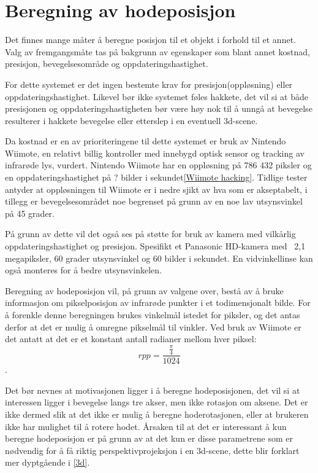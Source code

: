 \documentclass{report}
\begin{document}
\section{Beregning av hodeposisjon}
Det finnes mange måter å beregne posisjon til et objekt i forhold til et annet.
Valg av fremgangsmåte tas på bakgrunn av egenskaper som blant annet kostnad, presisjon, bevegelsesområde og oppdateringshastighet.

For dette systemet er det ingen bestemte krav for presisjon(oppløsning) eller oppdateringshastighet. Likevel bør ikke systemet
føles hakkete, det vil si at både presisjonen og oppdateringshastigheten bør være høy nok til å unngå at bevegelse resulterer i
hakkete bevegelse eller etterslep i en eventuell 3d-scene.

Da kostnad er en av prioriteringene til dette systemet er bruk av Nintendo Wiimote, en relativt billig kontroller med
innebygd optisk sensor og tracking av infrarøde lys, vurdert. Nintendo Wiimote har en oppløsning på 786 432 piksler og en oppdateringshastighet 
på ? bilder i sekundet\ref{Wiimote hacking}. Tidlige tester antyder at oppløsningen til Wiimote er i nedre sjikt av hva som er
akseptabelt, i tillegg er bevegelsesområdet noe begrenset på grunn av en noe lav utsynsvinkel på 45 grader.

På grunn av dette vil det også ses på støtte for bruk av kamera med vilkårlig oppdateringshastighet og presisjon.
Spesifikt et Panasonic HD-kamera med ~2,1 megapiksler, 60 grader utsynsvinkel og 60 bilder i sekundet. En vidvinkellinse
kan også monteres for å bedre utsynsvinkelen.

Beregning av hodeposisjon vil, på grunn av valgene over, bestå av å bruke informasjon om pikselposisjon av infrarøde punkter
i et todimensjonalt bilde. For å forenkle denne beregningen brukes vinkelmål istedet for piksler, og det antas derfor
at det er mulig å omregne pikselmål til vinkler. Ved bruk av Wiimote er det antatt at det er et konstant antall radianer
mellom hver piksel: $$rpp = \frac{\frac{\pi}{4}}{1024}$$.

Det bør nevnes at motivasjonen ligger i å beregne hodeposisjonen, det vil si at interessen ligger i bevegelse langs tre akser,
men ikke rotasjon om aksene. Det er ikke dermed slik at det ikke er mulig å beregne hoderotasjonen, eller at brukeren ikke har
mulighet til å rotere hodet. Årsaken til at det er interessant å kun beregne hodeposisjon er på grunn av at det kun er disse
parametrene som er nødvendig for å få riktig perspektivprojeksjon i en 3d-scene, dette blir forklart mer dyptgående i \ref{3d}.
\end{document}
